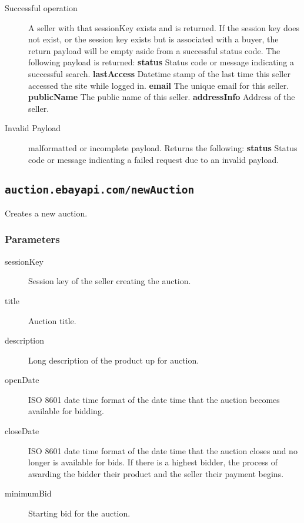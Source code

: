 \documentclass{article}
\newcommand{\code}[1]{\colorbox{light-gray}{\texttt{#1}}}
\begin{document}
\begin{description}
    \item[Successful operation] A seller with that sessionKey exists and is
        returned. If the session key does not exist, or the session key exists
        but is associated with a buyer, the return payload will be empty aside
        from a successful status code. The following payload is returned:
        \subitem\textbf{status} Status code or message indicating a successful
        search.
        \subitem\textbf{lastAccess} Datetime stamp of the last time this seller accessed the site while logged in.
        \subitem\textbf{email} The unique email for this seller.
        \subitem\textbf{publicName} The public name of this seller.
        \subitem\textbf{addressInfo} Address of the seller.

    \item[Invalid Payload] malformatted or incomplete payload.
        Returns the following:
        \subitem\textbf{status} Status code or message indicating a failed
        request due to an invalid payload.

\end{description}

\subsection{\code{auction.ebayapi.com/newAuction}}
Creates a new auction.

\subsubsection{Parameters}

\begin{description}
    \item[sessionKey] Session key of the seller creating the auction.
    \item[title] Auction title.
    \item[description] Long description of the product up for auction. 
    \item[openDate] ISO 8601 date time format of the date time that the auction becomes available for bidding.
    \item[closeDate] ISO 8601 date time format of the date time that the
        auction closes and no longer is available for bids. If there is a highest
        bidder, the process of awarding the bidder their product and the seller their
        payment begins. 
    \item[minimumBid] Starting bid for the auction.
\end{description}
\end{document}
